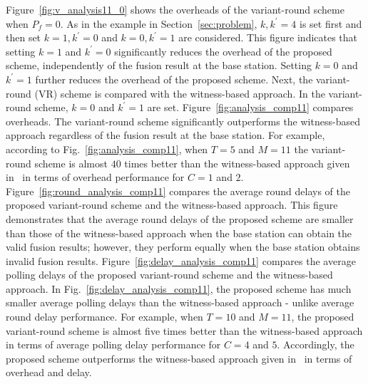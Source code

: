 \documentclass[12pt, onecolumn, draftcls]{IEEEtran}
\begin{document}
Figure~\ref{fig:v_analysis11_0} shows the overheads of the
variant-round scheme  when $P_f=0$. As in the example in
Section~\ref{sec:problem}, $k,k^{\prime}=4$ is set first and then
set $k=1,k^{\prime}=0$ and $k=0,k^{\prime}=1$ are considered. This
figure indicates that setting $k=1$ and $k^{\prime}=0$ significantly
reduces the overhead of the proposed scheme, independently of the
fusion result at the base station. Setting $k=0$ and $k^{\prime}=1$
further reduces the overhead of the proposed scheme. Next, the
variant-round (VR) scheme is compared with the witness-based
approach. In the variant-round scheme, $k=0$ and $k^{\prime}=1$ are
set. Figure~\ref{fig:analysis_comp11} compares overheads. The
variant-round scheme significantly outperforms the witness-based
approach regardless of the fusion result at the base station. For
example, according to Fig.~\ref{fig:analysis_comp11}, when $T=5$ and
$M=11$ the variant-round scheme is almost $40$ times better than the
witness-based approach given in~\cite{du:assurance} in terms of
overhead performance for $C=1$ and $2.$
Figure~\ref{fig:round_analysis_comp11} compares the average round
delays of the proposed variant-round scheme and the witness-based
approach. This figure demonstrates that the average round delays of
the proposed scheme are smaller than those of the witness-based
approach when the base station can obtain the valid fusion results;
however, they perform equally when the base station obtains invalid
fusion results. Figure~\ref{fig:delay_analysis_comp11} compares the
average polling delays of the proposed variant-round scheme and the
witness-based approach. In Fig.~\ref{fig:delay_analysis_comp11}, the
proposed scheme has much smaller average polling delays than the
witness-based approach - unlike average round delay performance. For
example, when $T=10$ and $M=11$, the proposed variant-round scheme
is almost five times better than the witness-based approach in terms
of average polling delay performance for $C=4$ and $5.$ Accordingly,
the proposed scheme outperforms the witness-based approach given
in~\cite{du:assurance} in terms of overhead and delay.
\end{document}
